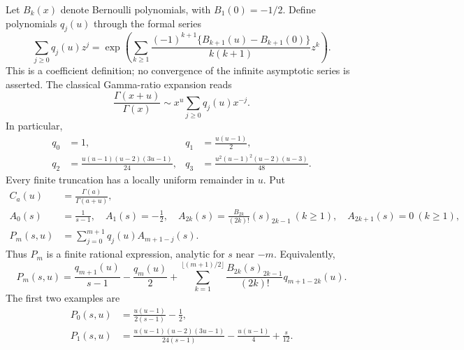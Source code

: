 Let $B_k(x)$ denote Bernoulli polynomials, with $B_1(0)=-1/2$.
Define polynomials $q_j(u)$ through the formal series
\begin{equation}\label{h2:eq:qgen}
 \sum_{j\ge0}q_j(u)z^j
 =\exp\left(\sum_{k\ge1}
       \frac{(-1)^{k+1}\{B_{k+1}(u)-B_{k+1}(0)\}}
            {k(k+1)}z^k\right).
\end{equation}
This is a coefficient definition; no convergence of the infinite
asymptotic series is asserted. The classical Gamma-ratio expansion
\cite{DLMFGamma} reads
\begin{equation}\label{h2:eq:ratio}
 \frac{\Gamma(x+u)}{\Gamma(x)}
   \sim x^u\sum_{j\ge0}q_j(u)x^{-j}.
\end{equation}
In particular,
\[
 \begin{aligned}
 q_0&=1,& q_1&=\frac{u(u-1)}2,\\
 q_2&=\frac{u(u-1)(u-2)(3u-1)}{24},&
 q_3&=\frac{u^2(u-1)^2(u-2)(u-3)}{48}.
 \end{aligned}
\]
Every finite truncation has a locally uniform remainder in $u$.
Put
\begin{align}
 C_a(u)&=\frac{\Gamma(a)}{\Gamma(a+u)},\label{h2:eq:C}\\
 A_0(s)&=\frac1{s-1},\quad A_1(s)=-\frac12,\quad
 A_{2k}(s)=\frac{B_{2k}}{(2k)!}(s)_{2k-1}\ (k\ge1),\quad
 A_{2k+1}(s)=0\ (k\ge1),\label{h2:eq:A}\\
 P_m(s,u)&=\sum_{j=0}^{m+1}q_j(u)A_{m+1-j}(s).
 \label{h2:eq:P}
\end{align}
Thus $P_m$ is a finite rational expression, analytic for $s$ near $-m$.
Equivalently,
\[
 P_m(s,u)=\frac{q_{m+1}(u)}{s-1}-\frac{q_m(u)}2
  +\sum_{k=1}^{\lfloor(m+1)/2\rfloor}
       \frac{B_{2k}(s)_{2k-1}}{(2k)!}q_{m+1-2k}(u).
\]
The first two examples are
\begin{align}
 P_0(s,u)&=\frac{u(u-1)}{2(s-1)}-\frac12,
 \label{h2:eq:P0}\\
 P_1(s,u)&=\frac{u(u-1)(u-2)(3u-1)}{24(s-1)}
             -\frac{u(u-1)}4+\frac{s}{12}.
 \label{h2:eq:P1}
\end{align}

